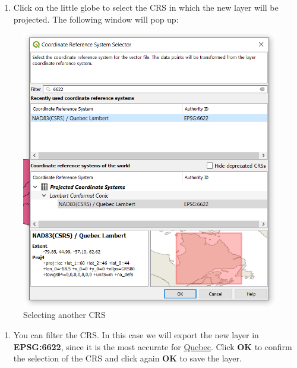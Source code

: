 \documentclass[]{book}
\providecommand{\tightlist}{%
  \setlength{\itemsep}{0pt}\setlength{\parskip}{0pt}}
\theoremstyle{definition}
\theoremstyle{definition}
\theoremstyle{definition}
\theoremstyle{remark}
\begin{document}
\begin{enumerate}
\def\labelenumi{\arabic{enumi}.}
\setcounter{enumi}{2}
\tightlist
\item
  Click on the little globe to select the CRS in which the new layer
  will be projected. The following window will pop up:
\end{enumerate}

\begin{figure}

{\centering \includegraphics[width=9.88in]{figures/Reproject_Layer_CRS} 

}

\caption{Selecting another CRS}\label{fig:unnamed-chunk-11}
\end{figure}

\begin{enumerate}
\def\labelenumi{\arabic{enumi}.}
\setcounter{enumi}{3}
\tightlist
\item
  You can filter the CRS. In this case we will export the new layer in
  \textbf{EPSG:6622}, since it is the most accurate for
  \href{https://epsg.io/6622}{Quebec}. Click \textbf{OK} to confirm the
  selection of the CRS and click again \textbf{OK} to save the layer.
\end{enumerate}
\end{document}
